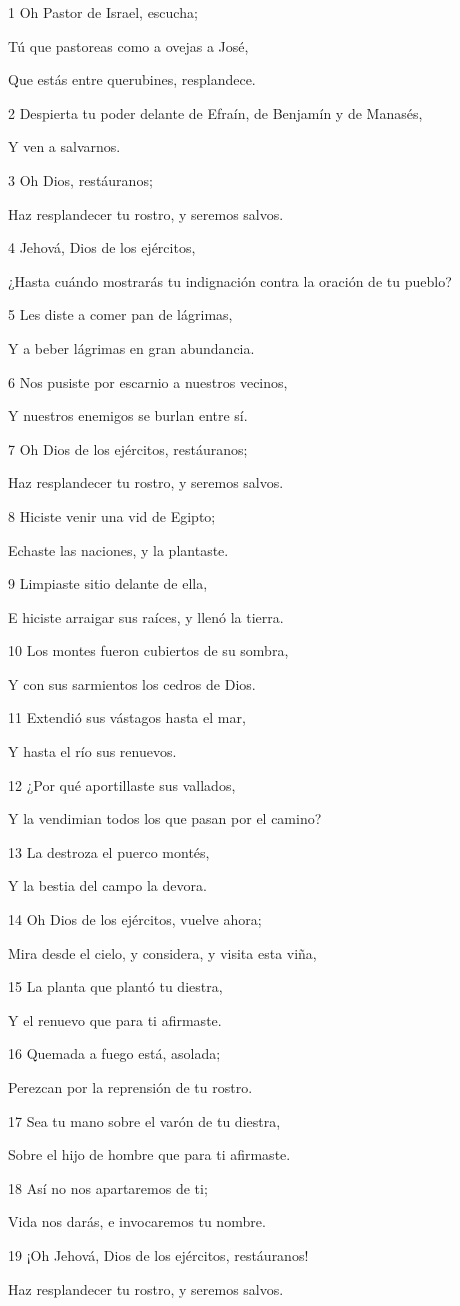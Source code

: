 \par 1 Oh Pastor de Israel, escucha;
\par Tú que pastoreas como a ovejas a José,
\par Que estás entre querubines, resplandece.
\par 2 Despierta tu poder delante de Efraín, de Benjamín y de Manasés,
\par Y ven a salvarnos.
\par 3 Oh Dios, restáuranos;
\par Haz resplandecer tu rostro, y seremos salvos.
\par 4 Jehová, Dios de los ejércitos,
\par ¿Hasta cuándo mostrarás tu indignación contra la oración de tu pueblo?
\par 5 Les diste a comer pan de lágrimas,
\par Y a beber lágrimas en gran abundancia.
\par 6 Nos pusiste por escarnio a nuestros vecinos,
\par Y nuestros enemigos se burlan entre sí.
\par 7 Oh Dios de los ejércitos, restáuranos;
\par Haz resplandecer tu rostro, y seremos salvos.
\par 8 Hiciste venir una vid de Egipto;
\par Echaste las naciones, y la plantaste.
\par 9 Limpiaste sitio delante de ella,
\par E hiciste arraigar sus raíces, y llenó la tierra.
\par 10 Los montes fueron cubiertos de su sombra,
\par Y con sus sarmientos los cedros de Dios.
\par 11 Extendió sus vástagos hasta el mar,
\par Y hasta el río sus renuevos.
\par 12 ¿Por qué aportillaste sus vallados,
\par Y la vendimian todos los que pasan por el camino?
\par 13 La destroza el puerco montés,
\par Y la bestia del campo la devora.
\par 14 Oh Dios de los ejércitos, vuelve ahora;
\par Mira desde el cielo, y considera, y visita esta viña,
\par 15 La planta que plantó tu diestra,
\par Y el renuevo que para ti afirmaste.
\par 16 Quemada a fuego está, asolada;
\par Perezcan por la reprensión de tu rostro.
\par 17 Sea tu mano sobre el varón de tu diestra,
\par Sobre el hijo de hombre que para ti afirmaste.
\par 18 Así no nos apartaremos de ti;
\par Vida nos darás, e invocaremos tu nombre.
\par 19 ¡Oh Jehová, Dios de los ejércitos, restáuranos!
\par Haz resplandecer tu rostro, y seremos salvos.

